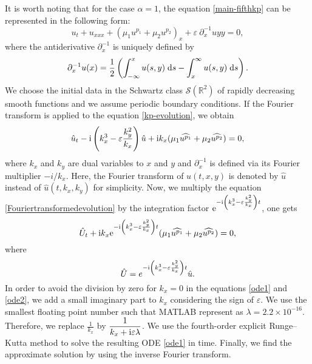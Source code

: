 \documentclass[10pt]{article}
\numberwithin{equation}{section}
\newcommand{\dd}{\;{\rm d}}
\newcommand{\ee}{{\rm e}}
\newcommand{\ii}{{\rm i}}
\begin{document}
	It is worth noting that for the case $\alpha=1$, the equation \eqref{main-fifthkp} can be represented in the following form:
	\begin{equation}\label{kp-evolution}
		u_t + u_{xxx} + (\mu_1 u^{p_1} + \mu_2 u^{p_2})_x + \varepsilon ~ \partial_x^{-1} u{yy} = 0,
	\end{equation}
	where the antiderivative $\partial_x^{-1}$ is uniquely defined by
	\begin{equation}
		\partial_x^{-1} u(x) = \frac{1}{2} \left( \int_{-\infty}^x u(s,y) \dd s - \int_{x}^{\infty} u(s,y)\dd s \right).
	\end{equation}
	We choose the initial data in the Schwartz class $\mathcal{S}(\mathbb{R}^2)$  of rapidly decreasing smooth functions and we assume periodic boundary conditions. If the  Fourier transform is applied to the equation \eqref{kp-evolution},
	we obtain 
	\begin{equation} \label{Fouriertransformedevolution}
		\hat{u}_t-\ii  \left( k_x^3 -\varepsilon \frac{ k_y^2}{k_x} \right)\hat{u} +\ii  k_x (\mu_1  \widehat{u^{p_1}}+\mu_2  \widehat{u^{p_2}})=0,
	\end{equation}
	where  $k_x$ and $k_y$ are dual variables to $x$ and $y$ and $\partial_x^{-1}$ is defined  via its Fourier multiplier $ -i/k_x$.
	Here, the Fourier transform of $u(t,x,y)$ is denoted by $\hat{u}$  instead of $\hat{u}(t,k_x,k_y)$ for simplicity.
	Now, we multiply the equation \eqref{Fouriertransformedevolution} by the integration factor $\ee^{-\ii  \left( k_x^3 -\varepsilon \frac{ k_y^2}{k_x} \right)t}$, one gets 
	\begin{equation} \label{ode1}
		\hat{U}_t + \ii  k_x \ee^{-\ii   \left( k_x^3 -\varepsilon \frac{ k_y^2}{k_x} \right)t}(\mu_1  \widehat{u^{p_1}}+\mu_2  \widehat{u^{p_2}})=0,
	\end{equation}
	where 
	\begin{equation}  \label{ode2}
		\hat{U}= e^{-\ii   \left( k_x^3 -\varepsilon \frac{ k_y^2}{k_x} \right)t} \hat{u}.
	\end{equation}
	In order to avoid the division by zero for $k_x=0$ in the equations \eqref{ode1} and  \eqref{ode2}, we add 
	a small imaginary part to $k_x$ considering the sign of $\varepsilon$.  We use the smallest floating point number such that MATLAB 
	represent as \mbox{$\lambda=2.2 \times 10^{-16}$}. Therefore, we replace $ \displaystyle\frac{1}{k_x}$ by $\displaystyle\frac{1}{k_x+ \ii \varepsilon \lambda}$.
	We use the fourth-order explicit Runge–Kutta method to solve the resulting ODE \eqref{ode1} in time. Finally, we find the approximate solution by using the inverse Fourier transform. 
	
\end{document}
